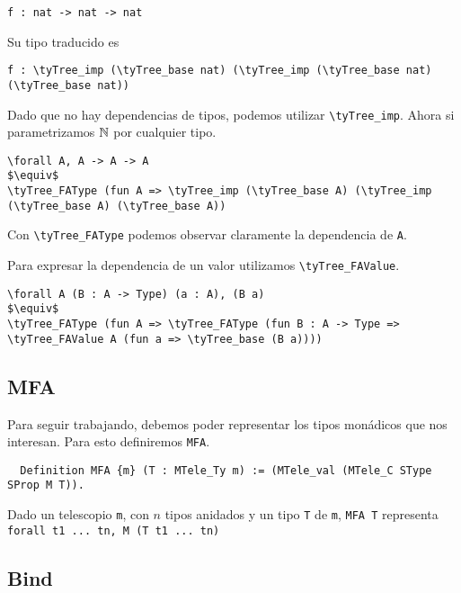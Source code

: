 \begin{lstlisting}
f : nat -> nat -> nat
\end{lstlisting}

Su tipo traducido es

\begin{lstlisting}
f : \tyTree_imp (\tyTree_base nat) (\tyTree_imp (\tyTree_base nat) (\tyTree_base nat))
\end{lstlisting}

Dado que no hay dependencias de tipos, podemos utilizar \lstinline{\tyTree_imp}. Ahora si parametrizamos
$\mathbb{N}$ por cualquier tipo.

\begin{lstlisting}
\forall A, A -> A -> A
$\equiv$
\tyTree_FAType (fun A => \tyTree_imp (\tyTree_base A) (\tyTree_imp (\tyTree_base A) (\tyTree_base A))
\end{lstlisting}

Con \lstinline{\tyTree_FAType} podemos observar claramente la dependencia de \lstinline{A}.

Para expresar la dependencia de un valor utilizamos \lstinline{\tyTree_FAValue}.

\begin{lstlisting}
\forall A (B : A -> Type) (a : A), (B a)
$\equiv$
\tyTree_FAType (fun A => \tyTree_FAType (fun B : A -> Type => \tyTree_FAValue A (fun a => \tyTree_base (B a))))
\end{lstlisting}


\subsection{MFA}

Para seguir trabajando, debemos poder representar los tipos monádicos que nos
interesan.
Para esto definiremos \lstinline{MFA}.

\begin{lstlisting}
  Definition MFA {m} (T : MTele_Ty m) := (MTele_val (MTele_C SType SProp M T)).
\end{lstlisting}

Dado un telescopio \lstinline{m}, con $n$ tipos anidados y un tipo \lstinline{T} de
\lstinline{m}, \lstinline{MFA T} representa \lstinline{forall t1 ... tn, M (T t1 ... tn)}


\subsection{Bind}

